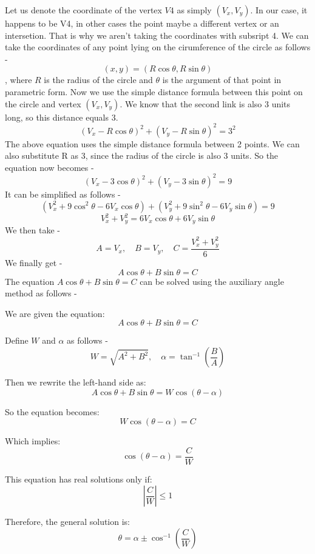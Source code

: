 \documentclass[12pt]{article}
\begin{document}
Let us denote the coordinate of the vertex $V4$ as simply $(V_x, V_y)$. In our case, it happens to be V4, in other cases the point maybe a different vertex or an intersetion. That is why we aren't taking the coordinates with subsript 4.
We can take the coordinates of any point lying on the cirumference of the circle as follows - $$(x,y)=(R\cos\theta, R\sin\theta)$$, where $R$ is the radius of the circle and $\theta$ is the argument of that point in parametric form.
\newline
\newline
Now we use the simple distance formula between this point on the circle and vertex $(V_x, V_y)$. We know that the second link is also 3 units long, so this distance equals 3.
$$(V_x-R\cos\theta)^2 + (V_y-R\sin\theta)^2=3^2$$
The above equation uses the simple distance formula between 2 points. We can also substitute R as 3, since the radius of the circle is also 3 units. So the equation now becomes - $$(V_x-3\cos\theta)^2 + (V_y-3\sin\theta)^2=9$$
It can be simplified as follows - 
$$(V_x^2 + 9\cos^2\theta-6V_x\cos\theta)+(V_y^2 + 9\sin^2\theta-6V_y\sin\theta)=9$$
$$V_x^2 + V_y^2 = 6V_x\cos\theta+6V_y\sin\theta$$
We then take - 
\[
A = V_x, \quad B = V_y, \quad C = \frac{V_x^2 + V_y^2}{6}
\]
We finally get - 
\[
A\cos\theta + B\sin\theta = C
\]
\clearpage
The equation $A\cos\theta + B\sin\theta = C$ can be solved using the auxiliary angle method as follows - 

We are given the equation:
\[
A\cos\theta + B\sin\theta = C
\]

Define $W$ and $\alpha$ as follows - 
\[
W = \sqrt{A^2 + B^2}, \quad \alpha = \tan^{-1}\left(\frac{B}{A}\right)
\]

Then we rewrite the left-hand side as:
\[
A\cos\theta + B\sin\theta = W\cos(\theta - \alpha)
\]

So the equation becomes:
\[
W\cos(\theta - \alpha) = C
\]

Which implies:
\[
\cos(\theta - \alpha) = \frac{C}{W}
\]

This equation has real solutions only if:
\[
\left| \frac{C}{W} \right| \leq 1
\]

Therefore, the general solution is:
\[
\theta = \alpha \pm \cos^{-1}\left( \frac{C}{W} \right)
\]
\end{document}

